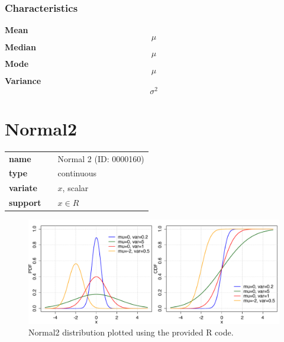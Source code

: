 \subsubsection*{Characteristics}
\smallskip \noindent \hspace{.2cm} \textbf{Mean} 
\begin{equation*}\mu\end{equation*}
\smallskip \noindent \hspace{.2cm} \textbf{Median} 
\begin{equation*}\mu\end{equation*}
\smallskip \noindent \hspace{.2cm} \textbf{Mode} 
\begin{equation*}\mu\end{equation*}
\smallskip \noindent \hspace{.2cm} \textbf{Variance} 
\begin{equation*}\sigma^2\end{equation*}
\smallskip
\section*{Normal2} 

  \bigskip 

\begin{tabular}{p{2cm}cl}
\textbf{name} & & Normal 2 (ID: 0000160)\\ 
 
\textbf{type} & & continuous \\ 

\textbf{variate} & & $x$, scalar \\ 

\textbf{support} & & $x \in R$
\end{tabular}

\begin{figure}[ht!]
\centering
  \includegraphics[width=140mm]{pics/Normal2.pdf}
 \caption{Normal2 distribution plotted using the provided R code.}
 \label{fig:Normal2}
\end{figure}

